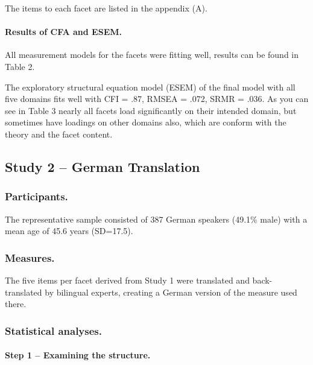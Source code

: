 \documentclass[,man]{apa6}
\let\oldparagraph\paragraph
\renewcommand{\paragraph}[1]{\oldparagraph{#1}\mbox{}}
\theoremstyle{definition}
\theoremstyle{definition}
\theoremstyle{definition}
\theoremstyle{remark}
\begin{document}
The items to each facet are listed in the appendix (A).

\hypertarget{results-of-cfa-and-esem.}{%
\paragraph{Results of CFA and ESEM.}\label{results-of-cfa-and-esem.}}

All measurement models for the facets were fitting well, results can be
found in Table 2.

The exploratory structural equation model (ESEM) of the final model with
all five domains fits well with CFI = .87, RMSEA = .072, SRMR = .036. As
you can see in Table 3 nearly all facets load significantly on their
intended domain, but sometimes have loadings on other domains also,
which are conform with the theory and the facet content.

\hypertarget{study-2-german-translation}{%
\subsection{Study 2 -- German
Translation}\label{study-2-german-translation}}

\hypertarget{participants.}{%
\subsubsection{Participants.}\label{participants.}}

The representative sample consisted of 387 German speakers (49.1\% male)
with a mean age of 45.6 years (SD=17.5).

\hypertarget{measures.-1}{%
\subsubsection{Measures.}\label{measures.-1}}

The five items per facet derived from Study 1 were translated and
back-translated by bilingual experts, creating a German version of the
measure used there.

\hypertarget{statistical-analyses.-1}{%
\subsubsection{Statistical analyses.}\label{statistical-analyses.-1}}

\hypertarget{step-1-examining-the-structure.}{%
\paragraph{Step 1 -- Examining the
structure.}\label{step-1-examining-the-structure.}}
\end{document}

